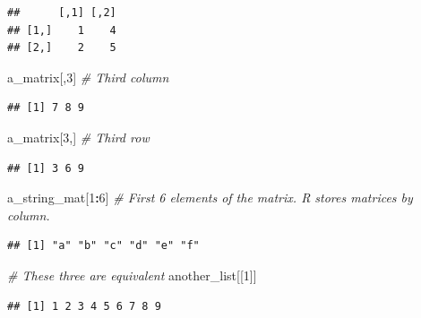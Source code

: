 \documentclass[
]{book}
\newenvironment{Shaded}{\begin{snugshade}}{\end{snugshade}}
\newcommand{\CommentTok}[1]{\textcolor[rgb]{0.56,0.35,0.01}{\textit{#1}}}
\newcommand{\DecValTok}[1]{\textcolor[rgb]{0.00,0.00,0.81}{#1}}
\newcommand{\NormalTok}[1]{#1}
\newcommand{\SpecialCharTok}[1]{\textcolor[rgb]{0.81,0.36,0.00}{\textbf{#1}}}
\begin{document}
\begin{enumerate}
\begin{verbatim}
##      [,1] [,2]
## [1,]    1    4
## [2,]    2    5
\end{verbatim}

\begin{Shaded}
\begin{Highlighting}[]
\NormalTok{a\_matrix[,}\DecValTok{3}\NormalTok{] }\CommentTok{\# Third column}
\end{Highlighting}
\end{Shaded}

\begin{verbatim}
## [1] 7 8 9
\end{verbatim}

\begin{Shaded}
\begin{Highlighting}[]
\NormalTok{a\_matrix[}\DecValTok{3}\NormalTok{,] }\CommentTok{\# Third row}
\end{Highlighting}
\end{Shaded}

\begin{verbatim}
## [1] 3 6 9
\end{verbatim}

\begin{Shaded}
\begin{Highlighting}[]
\NormalTok{a\_string\_mat[}\DecValTok{1}\SpecialCharTok{:}\DecValTok{6}\NormalTok{] }\CommentTok{\# First 6 elements of the matrix. R stores matrices by column.}
\end{Highlighting}
\end{Shaded}

\begin{verbatim}
## [1] "a" "b" "c" "d" "e" "f"
\end{verbatim}

\begin{Shaded}
\begin{Highlighting}[]
\CommentTok{\# These three are equivalent}
\NormalTok{another\_list[[}\DecValTok{1}\NormalTok{]]}
\end{Highlighting}
\end{Shaded}

\begin{verbatim}
## [1] 1 2 3 4 5 6 7 8 9
\end{verbatim}

\begin{Shaded}
\end{Shaded}


\end{enumerate}
\end{document}
